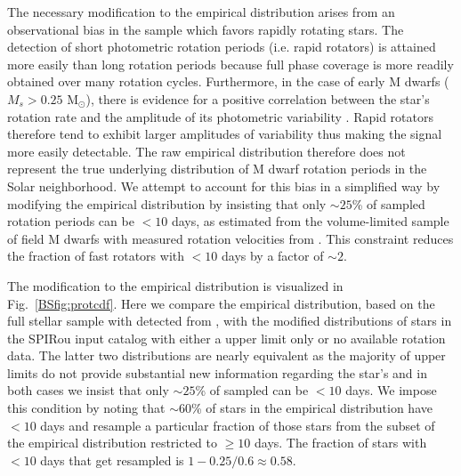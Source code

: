 The necessary modification to the empirical \prot{} distribution arises from
an observational bias in the \cite{newton16a} sample which favors rapidly rotating stars.
The detection of short photometric rotation periods (i.e. rapid rotators) is attained more
easily than long rotation periods because full phase coverage is more readily obtained over many
rotation cycles. Furthermore, in the case of early M dwarfs ($M_s > 0.25$ M$_{\odot}$), 
there is evidence for a positive correlation between the star's rotation rate and the
amplitude of its photometric variability \citep{newton16a}. Rapid rotators therefore
tend to exhibit larger amplitudes of variability thus making the signal more easily detectable.
The raw empirical distribution therefore does not represent the true underlying distribution of M
dwarf rotation periods in the Solar neighborhood. We attempt to account for this bias in a simplified
way by modifying the empirical \prot{} distribution by insisting that only
$\sim 25$\% of sampled rotation periods can be $<10$ days, as estimated from the volume-limited sample
of field M dwarfs with measured rotation velocities from \cite{delfosse98}. This constraint
reduces the fraction of fast rotators with \prot{} $< 10$ days by a factor of $\sim 2$.

The modification to the empirical \prot{} distribution is visualized in Fig.~\ref{BSfig:protcdf}.
Here we compare the empirical \prot{} distribution, based on the full stellar sample with detected
\prot{} from \cite{newton16a}, with the modified distributions of stars in the SPIRou input catalog
with either a \vsini{}
upper limit only or no available rotation data. The latter two distributions are nearly equivalent as
the majority of \vsini{} upper limits do not provide substantial new information regarding the star's \prot{}
and in both cases we insist that only $\sim 25$\% of sampled \prot{} can be $< 10$ days. We impose this
condition by noting that $\sim 60$\% of stars in the empirical distribution have \prot{} $<10$ days
and resample a particular fraction of those stars from the subset of the empirical distribution restricted
to \prot{} $\geq 10$ days. The fraction of stars with \prot{} $<10$ days that get resampled is
$1-0.25/0.6 \approx 0.58$.

